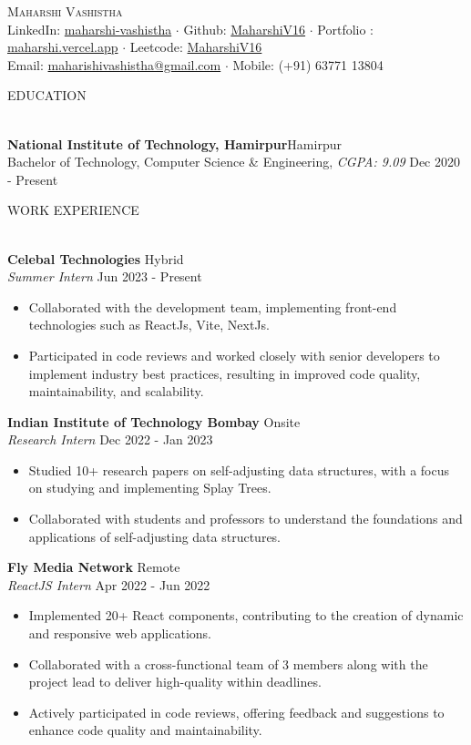 \documentclass[a4paper]{article}
\newcommand{\bulletSep} { \vspace{2mm} }
\newcommand{\sectionSep} { \vspace{4mm} }
\newcommand{\lineunder} {
    \vspace*{-8pt} \\
    \hspace*{-15pt} \hrulefill \\
}
\newcommand{\header} [1] {
    {\hspace*{-18pt}\vspace*{6pt} {
        \large \scshape #1
    }}
    \vspace*{-6pt} \lineunder
    \vspace{1mm}
}
\newcommand{\educationItem}[5]{
    \textbf{#1}\hfill #2\\
    #3, \textit{#4} \hfill #5\\
}
\newcommand{\experienceItem}[5]{
    \textbf{#1} \hfill #2 \\
    \textit{#3} \hfill #4 \\
    \begin{itemize}
        #5
    \end{itemize}
}
\begin{document}

\begin{center}
    {\Huge \scshape {}\selectfont Maharshi Vashistha}\\
    \bulletSep
    LinkedIn: \href{https://www.linkedin.com/in/maharshi-vashistha/}{maharshi-vashistha} $\cdot$
    Github: \href{https://github.com/MaharshiV16}{MaharshiV16} $\cdot$
    Portfolio : \href{https://maharshi.vercel.app/}{maharshi.vercel.app} $\cdot$
    Leetcode: \href{https://leetcode.com/MaharshiV16/}{MaharshiV16} \\
    \bulletSep
    Email: \href {mailto:maharishivashistha@gmail.com}{maharishivashistha@gmail.com} $\cdot$ Mobile: (+91) 63771 13804\\
    \sectionSep
\end{center}

\vspace{-3mm}


\header{EDUCATION}

\educationItem{National Institute of Technology, Hamirpur}{Hamirpur}{Bachelor of Technology, Computer Science \& Engineering}{CGPA: 9.09}{Dec 2020 - Present}

\sectionSep


\header{WORK EXPERIENCE}

\experienceItem{Celebal Technologies}{Hybrid}{Summer Intern}{Jun 2023 - Present}{
     \item Collaborated with the development team, implementing front-end technologies such as ReactJs, Vite, NextJs.
     \item Participated in code reviews and worked closely with senior developers to implement industry best practices, resulting in improved code quality, maintainability, and scalability.
}
\bulletSep

\experienceItem{Indian Institute of Technology Bombay}{Onsite}{Research Intern}{Dec 2022 - Jan 2023}{
     \item Studied 10+ research papers on self-adjusting data structures, with a focus on studying and implementing Splay Trees.
     \item Collaborated with students and professors to understand the foundations and applications of self-adjusting data structures.
}
\bulletSep

\experienceItem{Fly Media Network}{Remote}{ReactJS Intern}{Apr 2022 - Jun 2022}{
     \item Implemented 20+ React components, contributing to the creation of dynamic and responsive web applications.
     \item Collaborated with a cross-functional team of 3 members along with the project lead to deliver high-quality within deadlines.
    \item Actively participated in code reviews, offering feedback and suggestions to enhance code quality and maintainability.
}
\bulletSep
\end{document}
